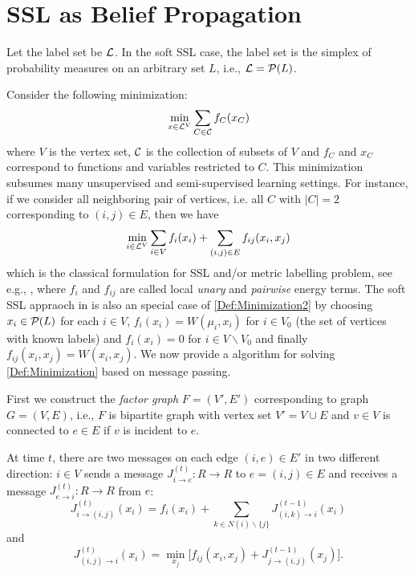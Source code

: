 \section{SSL as Belief Propagation}
	Let the label set be $\L$. In the soft SSL case, the label set is the simplex of probability measures on an arbitrary set $L$, i.e., $\L=\P(L)$. 
	
	
	Consider the following minimization: 
	\begin{equation}
	  \label{Def:Minimization}
	  \min_{x\in \L^V}\sum_{C\in \C}f_C(x_C)
	\end{equation}
where $V$ is the vertex set, $\C$ is the collection of subsets of $V$ and $f_C$ and $x_C$ correspond to functions and variables restricted to $C$.
This minimization subsumes many unsupervised and semi-supervised learning settings. For instance, if we consider all neighboring pair of vertices, i.e. all $C$ with $|C|=2$ corresponding to $(i, j)\in E$, then we have 
	\begin{equation}
	  \label{Def:Minimization2}
	  \min_{i\in \L^V}\sum_{i\in V}f_i(x_i) + \sum_{(i, j)\in E} f_{ij}(x_i, x_j)
	\end{equation}
which is the classical formulation for SSL and/or metric labelling problem, see e.g., \cite{Image_Labeling}, where $f_i$ and $f_{ij}$ are called local \textit{unary} and 
\textit{pairwise} energy terms. 
The soft SSL appraoch in \cite{Solomon:2014} is also an special case of \eqref{Def:Minimization2} by choosing $x_i\in \P(L)$ for each $i\in V$, $f_i(x_i) = W(\mu_i, x_i)$ for $i\in V_0$ (the set of vertices with known labels) and $f_i(x_i)=0$ for $i\in V\backslash V_0$ and finally $f_{ij}(x_i, x_j) = W(x_i, x_j)$. 
We now provide a algorithm for solving \eqref{Def:Minimization} based on message passing. 
	
	

First we construct the \textit{factor graph} $F=(V', E')$ corresponding to graph $G=(V, E)$, i.e., $F$ is bipartite graph with vertex set $V'=V\cup E$ and $v\in V$ is connected to $e\in E$ if $v$ is incident to $e$. 

At time $t$, there are two messages on each edge $(i, e)\in E'$ in two different direction: $i\in V$ sends a message $J^{(t)}_{i\to e}:R\to R$ to $e=(i, j)\in E$ and receives a message $J^{(t)}_{e\to i}:R\to R$ from $e$:
$$J^{(t)}_{i\to (i,j)} (x_i) = f_i(x_i) + \sum_{k\in N(i)\backslash \{j\}}J^{(t-1)}_{(i,k)\to i}(x_i)$$
and 
\begin{equation}\label{Eq:Update}
    J^{(t)}_{(i,j)\to i}(x_i) =  \min_{x_j}\Big[f_{ij}(x_i, x_j) + J^{(t-1)}_{j\to (i, j)}(x_j)\Big].
\end{equation}


